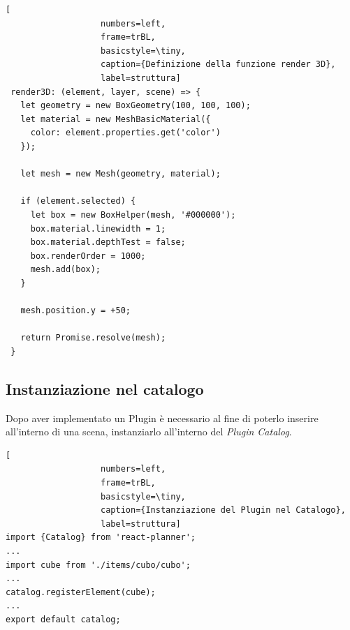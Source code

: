 \begin{lstlisting}[
                   numbers=left,
                   frame=trBL,
                   basicstyle=\tiny,
                   caption={Definizione della funzione render 3D},
                   label=struttura]
 render3D: (element, layer, scene) => {
   let geometry = new BoxGeometry(100, 100, 100);
   let material = new MeshBasicMaterial({
     color: element.properties.get('color')
   });

   let mesh = new Mesh(geometry, material);

   if (element.selected) {
     let box = new BoxHelper(mesh, '#000000');
     box.material.linewidth = 1;
     box.material.depthTest = false;
     box.renderOrder = 1000;
     mesh.add(box);
   }

   mesh.position.y = +50;

   return Promise.resolve(mesh);
 }
\end{lstlisting}
\newpage

\subsection{Instanziazione nel catalogo}
Dopo aver implementato un Plugin è necessario al fine di poterlo inserire all'interno di una scena, instanziarlo
all'interno del \emph{Plugin Catalog}.\\
\begin{lstlisting}[
                   numbers=left,
                   frame=trBL,
                   basicstyle=\tiny,
                   caption={Instanziazione del Plugin nel Catalogo},
                   label=struttura]
import {Catalog} from 'react-planner';
...
import cube from './items/cubo/cubo';
...
catalog.registerElement(cube);
...
export default catalog;
\end{lstlisting}

